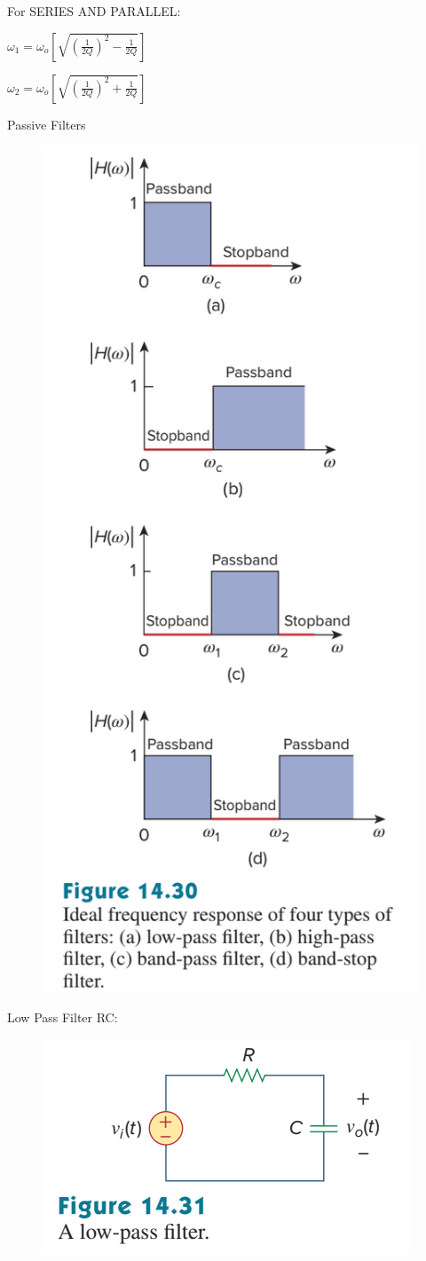 \documentclass[11pt]{article}
\begin{document}
\begin{subsection}{For SERIES AND PARALLEL:}

$\omega_1 = \omega_o [ \sqrt{({\frac{1}{2Q}})^2 - \frac{1}{2Q}}] $ \


$\omega_2 = \omega_o [ \sqrt{({\frac{1}{2Q}})^2 + \frac{1}{2Q}}] $ \

\end{subsection}



\begin{section}{Passive Filters}




\begin{figure}
	    \includegraphics[width=.4\textwidth]{passiveFilterGraph.png}
    \end{figure}


\begin{subsection}{Low Pass Filter}
RC:
\begin{figure}
 \includegraphics[bb=0 0 30 30]{LPF_RC.png}
\end{figure}


\end{subsection}
\end{section}
\end{document}
